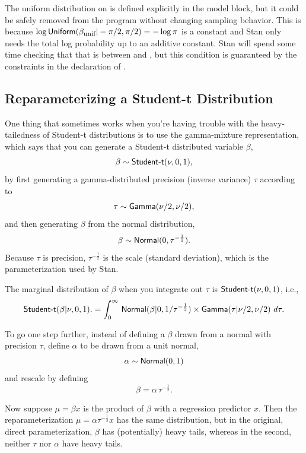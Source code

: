 The uniform distribution on  is defined explicitly in
the model block, but it could be safely removed from the program
without changing sampling behavior.  This is because $\log
\mbox{\sf Uniform}(\beta_{\mbox{\footnotesize unif}}|-\pi/2,\pi/2) =
-\log \pi$ is a constant and Stan only
needs the total log probability up to an additive constant.  Stan will spend
some time checking that that  is between
 and , but this condition is guaranteed by
the constraints in the declaration of .

\subsection{Reparameterizing a Student-t Distribution}

One thing that sometimes works when you're having trouble with the
heavy-tailedness of Student-t distributions is to use the
gamma-mixture representation, which says that you can generate a
Student-t distributed variable $\beta$,
\[
\beta \sim \mbox{\sf Student-t}(\nu, 0, 1),
\]
by first generating a gamma-distributed precision (inverse variance)
$\tau$ according to
\[
\tau \sim \mbox{\sf Gamma}(\nu/2, \nu/2),
\]
and then generating $\beta$ from the normal distribution,
\[
\beta \sim \mbox{\sf Normal}(0,\tau^{-\frac{1}{2}}).
\]
%
Because $\tau$ is precision, $\tau^{-\frac{1}{2}}$ is the scale
(standard deviation), which is the parameterization used by Stan.

The marginal distribution of $\beta$ when you integrate out $\tau$ is
$\mbox{\sf Student-t}(\nu, 0, 1)$, i.e.,
\[
\mbox{\sf Student-t}(\beta | \nu,0,1).
=
\int_0^{\infty}
\,
\mbox{\sf Normal}(\beta | 0, 1 / \tau^{-\frac{1}{2}})
\times
\mbox{\sf Gamma}(\tau | \nu/2, \nu/2)
\
d\tau.
\]
%

To go one step further, instead of defining a $\beta$ drawn from a
normal with precision $\tau$, define $\alpha$ to be drawn from a unit
normal,
%
\[
\alpha \sim \mbox{\sf Normal}(0,1)
\]
%
and rescale by defining
%
\[
\beta = \alpha \, \tau^{-\frac{1}{2}}.
\]
%

Now suppose $\mu = \beta x$ is the product of $\beta$ with a
regression predictor $x$.  Then the reparameterization $\mu = \alpha
\tau^{-\frac{1}{2}} x$ has the same distribution, but in the original, direct
parameterization, $\beta$ has (potentially) heavy tails, whereas in
the second, neither $\tau$ nor $\alpha$ have heavy tails.

